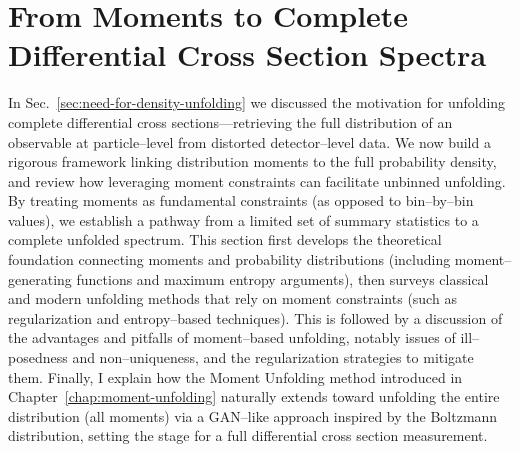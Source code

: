 \section{From Moments to Complete Differential Cross Section Spectra}
    In Sec.~\ref{sec:need-for-density-unfolding} we discussed the motivation for unfolding complete differential cross sections---retrieving the full distribution of an observable at particle--level from distorted detector--level data.
    We now build a rigorous framework linking distribution moments to the full probability density, and review how leveraging moment constraints can facilitate unbinned unfolding.
    By treating moments as fundamental constraints (as opposed to bin--by--bin values), we establish a pathway from a limited set of summary statistics to a complete unfolded spectrum.
    This section first develops the theoretical foundation connecting moments and probability distributions (including moment--generating functions and maximum entropy arguments), then surveys classical and modern unfolding methods that rely on moment constraints (such as regularization and entropy--based techniques).
    This is followed by a discussion of the advantages and pitfalls of moment--based unfolding, notably issues of ill--posedness and non--uniqueness, and the regularization strategies to mitigate them.
    Finally, I explain how the Moment Unfolding method introduced in Chapter~\ref{chap:moment-unfolding} naturally extends toward unfolding the entire distribution (all moments) via a GAN--like approach inspired by the Boltzmann distribution, setting the stage for a full differential cross section measurement.

